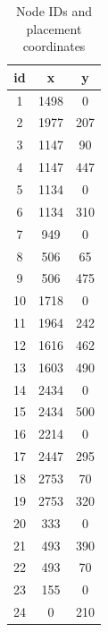 \documentclass[
  print, %
  Table,   %
  nolof,     %
  nolot,     %
           oneside
]{fithesis3}
\begin{document}
\begin{table}[h!!!]
  \begin{tabularx}{120px}{c|cc}

id &    x &    y\\
\midrule
1 &    1498 &    0\\
2 &    1977 &    207\\
3 &    1147 &    90\\
4 &    1147 &    447\\
5 &    1134 &    0\\
6 &    1134 &    310\\
7 &    949 &    0\\
8 &    506 &    65\\
9 &    506 &    475\\
10 &    1718 &    0\\
11 &    1964 &    242\\
12 &    1616 &    462\\
13 &    1603 &    490\\
14 &    2434 &    0\\
15 &    2434 &    500\\
16 &    2214 &    0\\
17 &    2447 &    295\\
18 &    2753 &    70\\
19 &    2753 &    320\\
20 &    333 &    0\\
21 &    493 &    390\\
22 &    493 &    70\\
23 &    155 &    0\\
24 &    0 &    210\\


\end{tabularx}
\caption[Node IDs and placement coordinates]{Node IDs and placement coordinates\protect\footnotemark}

\label{tab:map}
\end{table}


\newpage
\end{document}
